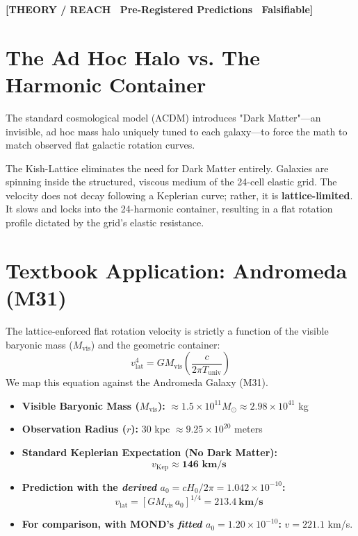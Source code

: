 \documentclass[11pt, letterpaper, openany]{book}
\begin{document}
\begin{center}
{\color{theorytag}\textbf{[THEORY / REACH \textbullet\ Pre-Registered Predictions \textbullet\ Falsifiable]}}
\end{center}

\section{The Ad Hoc Halo vs. The Harmonic Container}

The standard cosmological model (ΛCDM) introduces "Dark Matter"—an invisible, ad hoc mass halo uniquely tuned to each galaxy—to force the math to match observed flat galactic rotation curves.

The Kish-Lattice eliminates the need for Dark Matter entirely. Galaxies are spinning inside the structured, viscous medium of the 24-cell elastic grid. The velocity does not decay following a Keplerian curve; rather, it is \textbf{lattice-limited}. It slows and locks into the 24-harmonic container, resulting in a flat rotation profile dictated by the grid's elastic resistance.

\section{Textbook Application: Andromeda (M31)}

The lattice-enforced flat rotation velocity is strictly a function of the visible baryonic mass ($M_{\text{vis}}$) and the geometric container:
\[
v_{\text{lat}}^4 = G M_{\text{vis}} \left( \frac{c}{2\pi T_{\text{univ}}} \right)
\]
We map this equation against the Andromeda Galaxy (M31).

\begin{itemize}
    \item \textbf{Visible Baryonic Mass ($M_{\text{vis}}$):} $\approx 1.5 \times 10^{11} M_\odot \approx 2.98 \times 10^{41}$ kg
    \item \textbf{Observation Radius ($r$):} 30 kpc $\approx 9.25 \times 10^{20}$ meters
    \item \textbf{Standard Keplerian Expectation (No Dark Matter):} 
    \[
    v_{\text{Kep}} \approx \mathbf{146 \text{ km/s}}
    \]
    \item \textbf{Prediction with the \emph{derived} $a_0 = cH_0/2\pi = 1.042\times10^{-10}$:}
    \[
    v_{\text{lat}} = \left[ G M_{\text{vis}}\, a_0 \right]^{1/4} = \mathbf{213.4\ \text{km/s}}
    \]
    \item \textbf{For comparison, with MOND's \emph{fitted} $a_0 = 1.20\times10^{-10}$:}
    $v = 221.1$ km/s.
\end{itemize}
\end{document}
